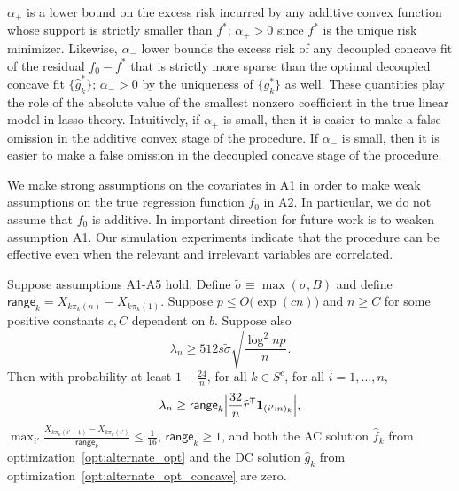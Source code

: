 $\alpha_+$ is a lower bound on the excess risk incurred by any additive convex function whose support is strictly smaller than $f^*$; $\alpha_+ > 0$ since $f^*$ is the unique risk minimizer. Likewise, $\alpha_-$ lower bounds the excess risk of any decoupled concave fit of the residual $f_0 - f^*$ that is strictly more sparse than the optimal decoupled concave fit $\{\hat{g}_k^*\}$; $\alpha_- > 0$ by the uniqueness of $\{g^*_k\}$ as well. These quantities play the role of the absolute value of the smallest nonzero coefficient in the true linear model in lasso theory.  Intuitively, if
$\alpha_{+}$ is small, then it is easier to make a false omission in the
additive convex stage of the procedure. If $\alpha_{-}$ is small, then
it is easier to make a false omission in the decoupled concave stage
of the procedure.

\begin{remark}
  We make strong assumptions on the covariates in A1 in order to make
  weak assumptions on the true regression function $f_0$ in
  A2. In particular, we do not assume that $f_0$ is additive. In
  important direction for future work is to weaken assumption A1.
  Our simulation experiments indicate that the procedure can be
  effective even when the relevant and irrelevant variables are correlated.
\end{remark}


\begin{theorem}
\label{thm:false_positive}
Suppose assumptions A1-A5 hold. Define $\tilde{\sigma} \equiv \max(\sigma, B)$ and define $\mathsf{range}_k = X_{k \pi_k(n)} - X_{k \pi_k(1)}$. Suppose $p \leq O\big( \exp(c n) \big)$ and $n \geq C$ for some positive constants $c, C$ dependent on $b$.  Suppose also
\begin{equation}
\lambda_n \geq 512 s \tilde{\sigma}  \sqrt{ \frac{\log^2 np}{n}}.
\end{equation}  
Then with probability at least $ 1 - \frac{24}{n}$, for all $k \in
S^c$, for all $i=1,\ldots,n$,
\begin{equation}
\lambda_n \geq \mathsf{range}_k \Big| \frac{32}{n}\widehat{r}^{\mathsf{T}} \mbox{\boldmath $1$}_{(i':n)_k} \Big| ,
\end{equation}
$\max_{i'} \frac{X_{k\pi_k(i'+1)} - X_{k \pi_k(i')}}{\mathsf{range}_k} \leq \frac{1}{16}$, $\mathsf{range}_k \geq 1$, and both the AC solution $\hat{f}_k$ from optimization~\eqref{opt:alternate_opt} and the DC solution $\hat{g}_k$ from optimization~\eqref{opt:alternate_opt_concave} are zero. 
\end{theorem}

